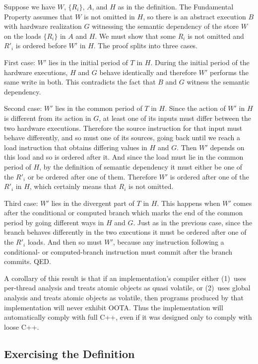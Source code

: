 Suppose we have $W$, $\{R_i\}$, $A$, and $H$ as in the definition.
The Fundamental Property assumes that $W$ is not omitted in $H$, so
there is an abstract execution $B$ with hardware realization $G$
witnessing the semantic dependency of the store $W$ on the loads
$\{R_i\}$ in $A$ and $H$.
We must show that some $R_i$ is not omitted and $R'_i$ is ordered
before $W'$ in $H$.
The proof splits into three cases.

First case: $W'$ lies in the initial period of $T$ in $H$.
During the initial period of the hardware executions, $H$ and $G$
behave identically and therefore $W'$ performs the same write in
both.
This contradicts the fact that $B$ and $G$ witness the semantic
dependency.

Second case: $W'$ lies in the common period of $T$ in $H$.
Since the action of $W'$ in $H$ is different from its action in $G$,
at least one of its inputs must differ between the two hardware
executions.
Therefore the source instruction for that input must behave
differently, and so must one of its sources, going back until we reach
a load instruction that obtains differing values in $H$ and $G$.
Then $W'$ depends on this load and so is ordered after it.
And since the load must lie in the common period of $H$, by the
definition of semantic dependency it must either be one of the
$R'_i$ or be ordered after one of them.
Therefore $W'$ is ordered after one of the $R'_i$ in $H$,
which certainly means that $R_i$ is not omitted.

Third case: $W'$ lies in the divergent part of $T$ in $H$.
This happens when $W'$ comes after the conditional or computed branch
which marks the end of the common period by going different ways in
$H$ and $G$.
Just as in the previous case, since the branch behaves differently in
the two executions it must be ordered after one of the $R'_i$ loads.
And then so must $W'$, because any instruction following a conditional-
or computed-branch instruction must commit after the branch commits.
QED.

A corollary of this result is that if an implementation's compiler
either
(1)~uses per-thread analysis and treats atomic objects as quasi
volatile, or
(2)~uses global analysis and treats atomic objects as volatile,
then programs produced by that implementation will never exhibit OOTA.
Thus the implementation will automatically comply with full C++, even
if it was designed only to comply with loose C++.

\subsection{Exercising the Definition}
\label{sec:Exercising the Definition}

